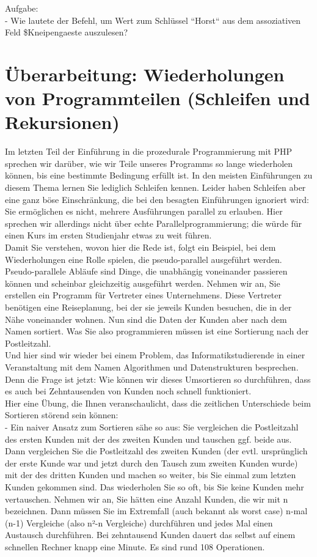 Aufgabe:\\

-	Wie lautete der Befehl, um Wert zum Schlüssel ``Horst`` aus dem assoziativen Feld \$Kneipengaeste auszulesen?

\section{Überarbeitung: Wiederholungen von Programmteilen (Schleifen und Rekursionen)}

Im letzten Teil der Einführung in die prozedurale Programmierung mit PHP sprechen wir darüber, wie wir Teile unseres Programms so lange wiederholen können, bis eine bestimmte Bedingung erfüllt ist. In den meisten Einführungen zu diesem Thema lernen Sie lediglich Schleifen kennen. Leider haben Schleifen aber eine ganz böse Einschränkung, die bei den besagten Einführungen ignoriert wird: Sie ermöglichen es nicht, mehrere Ausführungen parallel zu erlauben. Hier sprechen wir allerdings nicht über \glqq{}echte\grqq{} Parallelprogrammierung; die würde für einen Kurs im ersten Studienjahr etwas zu weit führen.\\

Damit Sie verstehen, wovon hier die Rede ist, folgt ein Beispiel, bei dem Wiederholungen eine Rolle spielen, die pseudo-parallel ausgeführt werden. Pseudo-parallele Abläufe sind Dinge, die unabhängig voneinander passieren können und scheinbar gleichzeitig ausgeführt werden. Nehmen wir an, Sie erstellen ein Programm für Vertreter eines Unternehmens. Diese Vertreter benötigen eine Reiseplanung, bei der sie jeweils Kunden besuchen, die in der Nähe voneinander wohnen. Nun sind die Daten der Kunden aber nach dem Namen sortiert. Was Sie also programmieren müssen ist eine Sortierung nach der Postleitzahl.\\

Und hier sind wir wieder bei einem Problem, das Informatikstudierende in einer Veranstaltung mit dem Namen Algorithmen und Datenstrukturen besprechen. Denn die Frage ist jetzt: Wie können wir dieses Umsortieren so durchführen, dass es auch bei Zehntausenden von Kunden noch schnell funktioniert.\\

Hier eine Übung, die Ihnen veranschaulicht, dass die zeitlichen Unterschiede beim Sortieren störend sein können: \\

-	Ein naiver Ansatz zum Sortieren sähe so aus: Sie vergleichen die Postleitzahl des ersten Kunden mit der des zweiten Kunden und tauschen ggf. beide aus. Dann vergleichen Sie die Postleitzahl des zweiten Kunden (der evtl. ursprünglich der erste Kunde war und jetzt durch den Tausch zum zweiten Kunden wurde) mit der des dritten Kunden und machen so weiter, bis Sie einmal zum letzten Kunden gekommen sind. Das wiederholen Sie so oft, bis Sie keine Kunden mehr vertauschen. Nehmen wir an, Sie hätten eine Anzahl Kunden, die wir mit n bezeichnen. Dann müssen Sie im Extremfall (auch bekannt als worst case) n-mal (n-1) Vergleiche (also n²-n Vergleiche) durchführen und jedes Mal einen Austausch durchführen. Bei zehntausend Kunden dauert das selbst auf einem schnellen Rechner knapp eine Minute. Es sind rund 108 Operationen.\\

